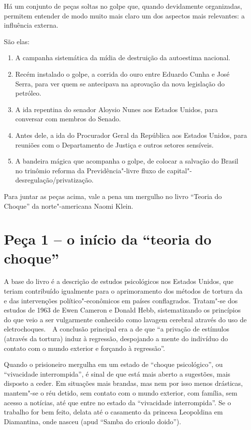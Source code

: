  

Há um conjunto de peças soltas no golpe que, quando devidamente
organizadas, permitem entender de modo muito mais claro um dos aspectos
mais relevantes: a influência externa.

São elas:

\begin{enumerate}
\itemsep1pt\parskip0pt
\item
  A campanha sistemática da mídia de destruição da autoestima nacional.
\item
  Recém instalado o golpe, a corrida do ouro entre Eduardo Cunha e José
  Serra, para ver quem se antecipava na aprovação da nova legislação do
  petróleo.
\item
  A ida repentina do senador Aloysio Nunes aos Estados Unidos, para
  conversar com membros do Senado.
\item
  Antes dele, a ida do Procurador Geral da República aos Estados Unidos,
  para reuniões com o Departamento de Justiça e outros setores
  sensíveis.
\item
  A bandeira mágica que acompanha o golpe, de colocar a salvação do
  Brasil no trinômio reforma da Previdência"-livre fluxo de
  capital"-desregulação/\allowbreak{}privatização.
\end{enumerate}

Para juntar as peças acima, vale a pena um mergulho no livro ``Teoria do
Choque'' da norte"-americana Naomi Klein.

\section{Peça 1 -- o início da ``teoria do choque''}

A base do livro é a descrição de estudos psicológicos nos Estados
Unidos, que teriam contribuído igualmente para o aprimoramento dos
métodos de tortura da  e das intervenções político"-econômicos em
países conflagrados. Tratam"-se dos estudos de 1963 de Ewen Cameron e
Donald Hebb, sistematizando os princípios do que veio a ser vulgarmente
conhecido como lavagem cerebral através do uso de eletrochoques.~~A
conclusão principal era a de que ``a privação de estímulos (através da
tortura) induz à regressão, despojando a mente do indivíduo do contato
com o mundo exterior e forçando à regressão''.

Quando o prisioneiro mergulha em um estado de ``choque psicológico'', ou
``vivacidade interrompida'', é sinal de que está mais aberto a
sugestões, mais disposto a ceder. Em situações mais brandas, mas nem por
isso menos drásticas, mantem"-se o réu detido, sem contato com o mundo
exterior, com família, sem acesso a notícias, até que entre no estado da
``vivacidade interrompida''. Se o trabalho for bem feito, delata até o
casamento da princesa Leopoldina em Diamantina, onde nasceu  (apud
``Samba do crioulo doido'').

